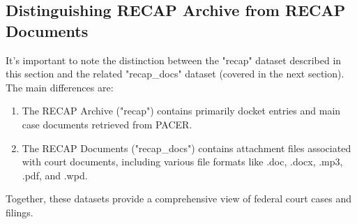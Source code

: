 \subsection{Distinguishing RECAP Archive from RECAP Documents}

It's important to note the distinction between the "recap" dataset described in this section and the related "recap\_docs" dataset (covered in the next section). The main differences are:

\begin{enumerate}
    \item The RECAP Archive ("recap") contains primarily docket entries and main case documents retrieved from PACER.
    \item The RECAP Documents ("recap\_docs") contains attachment files associated with court documents, including various file formats like .doc, .docx, .mp3, .pdf, and .wpd.
\end{enumerate}

Together, these datasets provide a comprehensive view of federal court cases and filings.